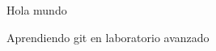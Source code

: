 \documentclass{article}
\begin{document}
Hola mundo


Aprendiendo git en laboratorio avanzado
\end{document}
